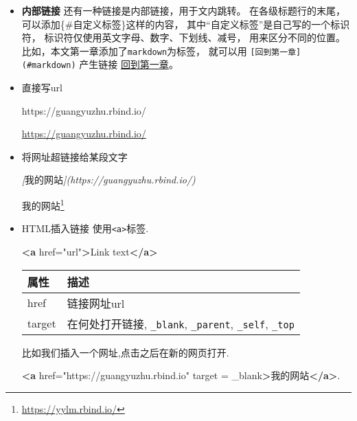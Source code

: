 \documentclass[]{ctexbook}
\newenvironment{Shaded}{\begin{snugshade}}{\end{snugshade}}
\newcommand{\CommentTok}[1]{\textcolor[rgb]{0.56,0.35,0.01}{\textit{#1}}}
\newcommand{\KeywordTok}[1]{\textcolor[rgb]{0.13,0.29,0.53}{\textbf{#1}}}
\newcommand{\NormalTok}[1]{#1}
\newcommand{\OtherTok}[1]{\textcolor[rgb]{0.56,0.35,0.01}{#1}}
\newcommand{\StringTok}[1]{\textcolor[rgb]{0.31,0.60,0.02}{#1}}
\renewcommand{\href}[2]{#2\footnote{\url{#1}}}
\begin{document}
\begin{itemize}
\item
  \textbf{内部链接}
  还有一种链接是内部链接，用于文内跳转。 在各级标题行的末尾， 可以添加\{\#自定义标签\}这样的内容， 其中``自定义标签''是自己写的一个标识符， 标识符仅使用英文字母、数字、下划线、减号， 用来区分不同的位置。 比如，本文第一章添加了\texttt{markdown}为标签， 就可以用 \texttt{{[}回到第一章{]}(\#markdown)} 产生链接 \protect\hyperlink{markdown}{回到第一章}。
\item
  直接写url

\begin{Shaded}
\begin{Highlighting}[]
\NormalTok{https://guangyuzhu.rbind.io/}
\end{Highlighting}
\end{Shaded}

  \url{https://guangyuzhu.rbind.io/}
\item
  将网址超链接给某段文字

\begin{Shaded}
\begin{Highlighting}[]
\CommentTok{[}\OtherTok{我的网站}\CommentTok{](https://guangyuzhu.rbind.io/)}
\end{Highlighting}
\end{Shaded}

  \href{https://yylm.rbind.io/}{我的网站}
\item
  HTML插入链接
  使用\texttt{\textless{}a\textgreater{}}标签.

\begin{Shaded}
\begin{Highlighting}[]
\KeywordTok{\textless{}a}\OtherTok{ href=}\StringTok{"url"}\KeywordTok{\textgreater{}}\NormalTok{Link text}\KeywordTok{\textless{}/a\textgreater{}}
\end{Highlighting}
\end{Shaded}

  \begin{longtable}[]{@{}ll@{}}
  \toprule
  属性 & 描述\tabularnewline
  \midrule
  \endhead
  href & 链接网址url\tabularnewline
  target & 在何处打开链接, \texttt{\_blank}, \texttt{\_parent}, \texttt{\_self}, \texttt{\_top}\tabularnewline
  \bottomrule
  \end{longtable}

  比如我们插入一个网址,点击之后在新的网页打开.

\begin{Shaded}
\begin{Highlighting}[]
\KeywordTok{\textless{}a}\OtherTok{ href=}\StringTok{"https://guangyuzhu.rbind.io"}\OtherTok{ target} \OtherTok{=} \StringTok{\textquotesingle{}\_blank\textquotesingle{}}\KeywordTok{\textgreater{}}\NormalTok{我的网站}\KeywordTok{\textless{}/a\textgreater{}}\NormalTok{.}
\end{Highlighting}
\end{Shaded}


\end{itemize}
\end{document}
